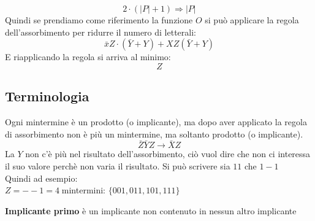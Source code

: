 \documentclass[a4paper]{article}
\theoremstyle{break}
\theoremstyle{break}
\theoremstyle{break}
\theoremstyle{break}
\begin{document}
\[
2 \cdot (|P|+1) \Rightarrow |P|
\] 
Quindi se prendiamo come riferimento la funzione \( O \) si può applicare la 
regola dell'assorbimento per ridurre il numero di letterali:
\[ \bar{x}Z \cdot (\bar{Y}+Y) + XZ(\bar{Y}+Y) \]
E riapplicando la regola si arriva al minimo:
\[
Z
\] 
\label{D7}
\subsection{Terminologia}
Ogni mintermine è un prodotto (o implicante), ma dopo aver applicato la regola
di assorbimento non è più un mintermine, ma soltanto prodotto (o implicante).
\[
    \bar{Z}\bar{Y}Z \to \bar{X}Z
\] 
La \( Y \) non c'è più nel risultato dell'assorbimento, ciò vuol dire che non
ci interessa il suo valore perchè non varia il risultato. Si può scrivere sia
\(
11
\)
che
\(
1-1
\)\\ 
Quindi ad esempio:\\
\( Z=--1=4\; \)mintermini: \( \{ 001, 011, 101, 111 \} \)
\begin{definition}
   \textbf{Implicante primo} è un implicante non contenuto in nessun altro
   implicante
\end{definition}
\end{document}

